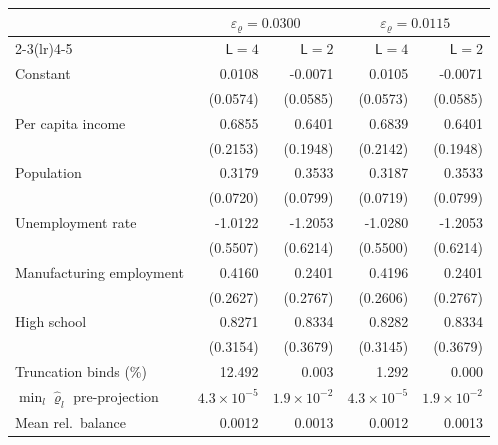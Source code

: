 \begin{tabular}{lrrrr}
\toprule
 & \multicolumn{2}{c}{$\varepsilon_\varrho = 0.0300$} & \multicolumn{2}{c}{$\varepsilon_\varrho = 0.0115$} \\
\cmidrule(lr){2-3}\cmidrule(lr){4-5}
 & $\mathsf L = 4$ & $\mathsf L = 2$ & $\mathsf L = 4$ & $\mathsf L = 2$ \\
\midrule
Constant & 0.0108 & -0.0071 & 0.0105 & -0.0071 \\
 & (0.0574) & (0.0585) & (0.0573) & (0.0585) \\
Per capita income & 0.6855 & 0.6401 & 0.6839 & 0.6401 \\
 & (0.2153) & (0.1948) & (0.2142) & (0.1948) \\
Population & 0.3179 & 0.3533 & 0.3187 & 0.3533 \\
 & (0.0720) & (0.0799) & (0.0719) & (0.0799) \\
Unemployment rate & -1.0122 & -1.2053 & -1.0280 & -1.2053 \\
 & (0.5507) & (0.6214) & (0.5500) & (0.6214) \\
Manufacturing employment & 0.4160 & 0.2401 & 0.4196 & 0.2401 \\
 & (0.2627) & (0.2767) & (0.2606) & (0.2767) \\
High school & 0.8271 & 0.8334 & 0.8282 & 0.8334 \\
 & (0.3154) & (0.3679) & (0.3145) & (0.3679) \\
\midrule
Truncation binds (\%) & 12.492 & 0.003 & 1.292 & 0.000 \\
$\min_l\hat\varrho_l$ pre-projection & $4.3 \times 10^{-5}$ & $1.9 \times 10^{-2}$ & $4.3 \times 10^{-5}$ & $1.9 \times 10^{-2}$ \\
Mean rel.\ balance & 0.0012 & 0.0013 & 0.0012 & 0.0013 \\
\bottomrule
\end{tabular}
